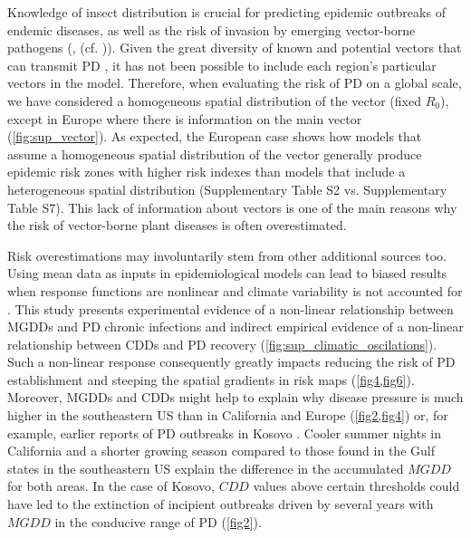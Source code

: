     Knowledge of insect distribution is crucial for predicting epidemic
    outbreaks
    of endemic diseases, as well as the risk of invasion by emerging
    vector-borne
    pathogens (\cite {Caminade2017,Jeger2019}, (cf. \cite{Schneider2020})).
    Given
    the great diversity of known and potential vectors that can transmit PD
    \cite{Redak2004}, it has not been possible to include each region's
    particular
    vectors in the model. Therefore, when evaluating the risk of PD on a global
    scale, we have considered a homogeneous spatial distribution of the vector
    (fixed $ R_0 $), except in Europe where there is information on the main
    vector
    (\cref{fig:sup_vector}). As expected, the European case shows how models
    that
    assume a homogeneous spatial distribution of the vector generally produce
    epidemic risk zones with higher risk indexes than models that include a
    heterogeneous spatial distribution	(Supplementary Table S2 vs.
    Supplementary
    Table S7). This lack of information about vectors is one of the main
    reasons
    why the risk of vector-borne plant diseases is often overestimated.

    Risk overestimations may involuntarily stem from other additional sources
    too.
    Using mean data as inputs in epidemiological models can lead to biased
    results
    when response functions are nonlinear and climate variability is not
    accounted
    for \cite{Scherm1994}. This study presents experimental evidence of a
    non-linear relationship between MGDDs and PD chronic infections and
    indirect
    empirical evidence of a non-linear relationship between CDDs and PD
    recovery
    (\cref{fig:sup_climatic_oscilations}). Such a non-linear response
    consequently greatly
    impacts reducing the risk of PD establishment and steeping the spatial
    gradients in risk maps (\cref{fig4,fig6}). Moreover, MGDDs and CDDs might
    help
    to explain why disease pressure is much higher in the southeastern US than
    in
    California and Europe (\cref{fig2,fig4}) or, for example, earlier reports
    of PD
    outbreaks in Kosovo  \cite{Berisha1998}. Cooler summer nights in California
    and
    a shorter growing season compared to those found in the Gulf states in the
    southeastern US explain the difference in the accumulated $MGDD$ for both
    areas. In the case of Kosovo, $CDD$ values above certain thresholds could
    have
    led to the extinction of incipient outbreaks driven by several years with
$MGDD$ in the conducive range of PD (\cref{fig2}).

